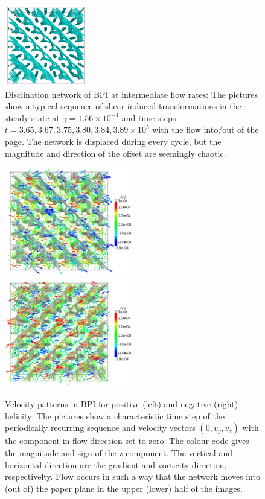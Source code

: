\documentclass[aps,pre,reprint,superscriptaddress, twocolumn]{revtex4}
\newcommand{\e}[1]{\times10^{#1}}
\newcommand{\gd}{\dot{\gamma}}
\begin{document}
\begin{figure}[ht]
\includegraphics[width=0.32\textwidth]{disc-389k_run914.png}
\caption{Disclination network of BPI at intermediate flow rates: The pictures show a typical sequence of shear-induced transformations in the steady state at $\gd=1.56\e{-4}$ and time steps $t=3.65, 3.67,3.75,3.80,3.84,3.89\e{5}$ with the flow into/out of the page. The network is displaced during every cycle, but the magnitude and direction of the offset are seemingly chaotic.}
\label{bp1-med}
\end{figure}

\begin{figure}[ht]
\includegraphics[width=0.495\textwidth]{v_yz-v_z-360k_run914.png}
\includegraphics[width=0.495\textwidth]{v_yz-v_z-360k_run922.png}
\caption{Velocity patterns in BPI for positive (left) and negative (right) helicity: The pictures show a characteristic time step of the periodically recurring sequence and velocity vectors $(0,v_y,v_z)$ with the component in flow direction set to zero. The colour code gives the magnitude and sign of the z-component. The vertical and horizontal direction are the gradient and vorticity direction, respectivelty. Flow occurs in such a way that the network moves into (out of) the paper plane in the upper (lower) half of the images.}
\label{bp1-velo}
\end{figure}
\end{document}
